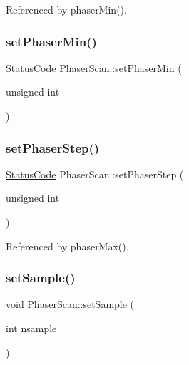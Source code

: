 Referenced by phaser\+Min().

\mbox{\label{classPhaserScan_abc98adb04157f08d1c1ba99eee527a37}} 
\subsubsection{\texorpdfstring{set\+Phaser\+Min()}{setPhaserMin()}}
{\footnotesize\ttfamily \hyperlink{classStatusCode}{Status\+Code} Phaser\+Scan\+::set\+Phaser\+Min (\begin{DoxyParamCaption}\item[{unsigned}]{int }\end{DoxyParamCaption})}

\mbox{\label{classPhaserScan_a99ff5030b4e551437796c5614f92fffd}} 
\subsubsection{\texorpdfstring{set\+Phaser\+Step()}{setPhaserStep()}}
{\footnotesize\ttfamily \hyperlink{classStatusCode}{Status\+Code} Phaser\+Scan\+::set\+Phaser\+Step (\begin{DoxyParamCaption}\item[{unsigned}]{int }\end{DoxyParamCaption})}



Referenced by phaser\+Max().

\mbox{\label{classPhaserScan_ae66b02455c6d5779ba92d3a17abd7ead}} 
\subsubsection{\texorpdfstring{set\+Sample()}{setSample()}}
{\footnotesize\ttfamily void Phaser\+Scan\+::set\+Sample (\begin{DoxyParamCaption}\item[{int}]{nsample }\end{DoxyParamCaption})\hspace{0.3cm}{\ttfamily [inline]}}




